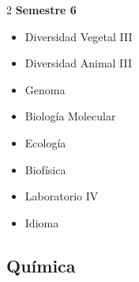 \documentclass[12pt,a4paper]{article}
\begin{document}
\begin{multicols}{2}
		\textbf{Semestre 6}
		\begin{itemize}
			\item Diversidad Vegetal III
			\item Diversidad Animal III
			\item Genoma
			\item Biología Molecular
			\item Ecología
			\item Biofísica
			\item Laboratorio IV
			\item Idioma
		\end{itemize}
	\end{multicols}
	
	\newpage
	
	\subsection{Química}
	
\end{document}
